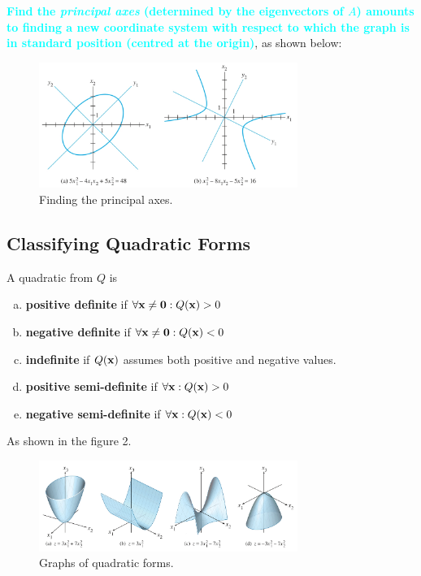     \textbf{\textcolor{cyan}{Find the \textit{principal axes} (determined by the eigenvectors of $A$) amounts to finding a new coordinate system with respect to which the graph is in standard position (centred at the origin)}}, as shown below:
    \begin{figure}[ht]
    \centering
    \includegraphics[width=0.75\textwidth]{images/principal-axes.png}
    \caption{Finding the principal axes.}
    \end{figure}
    
    \subsection{Classifying Quadratic Forms}
    \begin{Def}\label{quad-def}
        A quadratic from $Q$ is
        \begin{enumerate}[(a)]
            \item \textbf{positive definite} if $\forall \mathbf{x} \neq \mathbf{0}:Q(\mathbf{x}) > 0$
             \item \textbf{negative definite} if $\forall \mathbf{x} \neq \mathbf{0}:Q(\mathbf{x}) < 0$
             \item \textbf{indefinite} if $Q(\mathbf{x})$ assumes both positive and negative values.
             \item \textbf{positive semi-definite} if $\forall \mathbf{x}:Q(\mathbf{x}) > 0$
             \item \textbf{negative semi-definite} if $\forall \mathbf{x}:Q(\mathbf{x}) < 0$
        \end{enumerate}

    \end{Def}
        As shown in the figure 2.
        \begin{figure}
        \centering
        \includegraphics[width=0.75\textwidth]{images/quadratic-class.png}
        \caption{Graphs of quadratic forms.}
        \end{figure}
        
